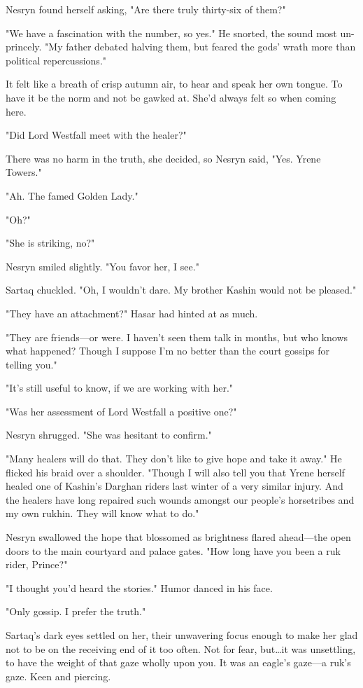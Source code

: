 Nesryn found herself asking, "Are there truly thirty-six of them?"

"We have a fascination with the number, so yes."
He snorted, the sound most un-princely.
"My father debated halving them, but feared the gods' wrath more than political repercussions."

It felt like a breath of crisp autumn air, to hear and speak her own tongue.
To have it be the norm and not be gawked at.
She'd always felt so when coming here.

"Did Lord Westfall meet with the healer?"

There was no harm in the truth, she decided, so Nesryn said, "Yes.
Yrene Towers."

"Ah.
The famed Golden Lady."

"Oh?"

"She is striking, no?"

Nesryn smiled slightly.
"You favor her, I see."

Sartaq chuckled.
"Oh, I wouldn't dare.
My brother Kashin would not be pleased."

"They have an attachment?"
Hasar had hinted at as much.

"They are friends---or were.
I haven't seen them talk in months, but who knows what happened?
Though I suppose I'm no better than the court gossips for telling you."

"It's still useful to know, if we are working with her."

"Was her assessment of Lord Westfall a positive one?"

Nesryn shrugged.
"She was hesitant to confirm."

"Many healers will do that.
They don't like to give hope and take it away."
He flicked his braid over a shoulder.
"Though I will also tell you that Yrene herself healed one of Kashin's Darghan riders last winter of a very similar injury.
And the healers have long repaired such wounds amongst our people's horsetribes and my own rukhin.
They will know what to do."

Nesryn swallowed the hope that blossomed as brightness flared ahead---the open doors to the main courtyard and palace gates.
"How long have you been a ruk rider, Prince?"

"I thought you'd heard the stories."
Humor danced in his face.

"Only gossip.
I prefer the truth."

Sartaq's dark eyes settled on her, their unwavering focus enough to make her glad not to be on the receiving end of it too often.
Not for fear, but\ldots it was unsettling, to have the weight of that gaze wholly upon you.
It was an eagle's gaze---a ruk's gaze.
Keen and piercing.

